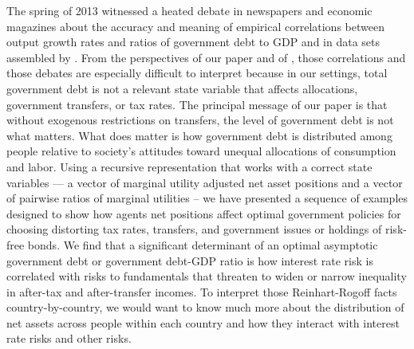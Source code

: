 \documentclass[thmsb,11pt]{article}
\begin{document}
{  The spring of 2013 witnessed a heated debate in newspapers and economic magazines about the accuracy and meaning of empirical  correlations between output growth rates and
ratios of government debt to GDP and  in data sets assembled by \cite{Reinhart2010}.
From the  perspectives of our paper and of  \cite{Wer07a}, those correlations and those debates are especially difficult to interpret
because in our settings, total government debt is not a relevant state variable that affects allocations, government transfers, or tax rates.
The principal message of our paper  is that  without exogenous restrictions on transfers, the level of government debt is not what matters. What
 does matter is how government  debt is distributed among people relative to society's attitudes toward unequal allocations of consumption and labor.  Using a recursive representation that works with a correct state variables --- a vector of marginal utility adjusted net asset positions and a vector of pairwise ratios of marginal utilities  --  we have
 presented  a sequence of examples designed to show how  agents net positions affect optimal government policies for choosing distorting tax
 rates, transfers, and government issues or holdings of risk-free bonds. We find that a significant determinant of an optimal asymptotic government
 debt or government debt-GDP ratio is how interest rate risk is correlated with risks to fundamentals that threaten to widen or narrow
 inequality in after-tax and after-transfer incomes. To interpret those Reinhart-Rogoff facts country-by-country, we would
 want to know much more about the distribution of net assets across people within each country and how they interact with interest rate risks and other risks.

\smallskip

\smallskip

\smallskip

\pagebreak

}
\end{document}
